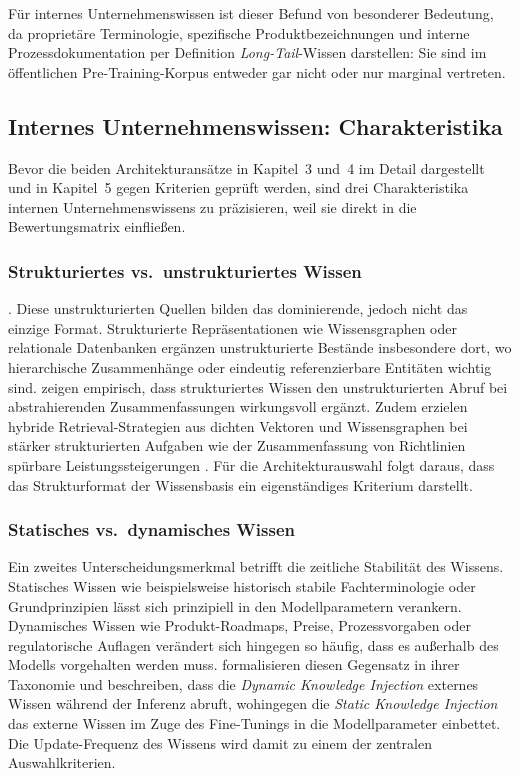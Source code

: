 Für internes Unternehmenswissen ist dieser Befund von besonderer Bedeutung, 
da proprietäre Terminologie, spezifische Produktbezeichnungen und interne 
Prozessdokumentation per Definition \textit{Long-Tail}-Wissen darstellen: Sie sind im 
öffentlichen Pre-Training-Korpus entweder gar nicht oder nur marginal vertreten.

\subsection{Internes Unternehmenswissen: Charakteristika}
\label{sec:unternehmenswissen}

Bevor die beiden Architekturansätze in Kapitel~3 und~4 im Detail dargestellt und in Kapitel~5 gegen Kriterien geprüft werden, sind drei Charakteristika internen Unternehmenswissens zu präzisieren, weil sie direkt in die Bewertungsmatrix einfließen.

\subsubsection{Strukturiertes vs.\ unstrukturiertes Wissen}
\label{sec:strukturiertes-wissen}

. Diese unstrukturierten Quellen bilden das dominierende, jedoch nicht das einzige Format. Strukturierte Repräsentationen wie Wissensgraphen oder relationale Datenbanken ergänzen unstrukturierte Bestände insbesondere dort, wo hierarchische Zusammenhänge oder eindeutig referenzierbare Entitäten wichtig sind. \textcite[17]{Karakurt.2026} zeigen empirisch, dass strukturiertes Wissen den unstrukturierten Abruf bei abstrahierenden Zusammenfassungen wirkungsvoll ergänzt. Zudem erzielen hybride Retrieval-Strategien aus dichten Vektoren und Wissensgraphen bei stärker strukturierten Aufgaben wie der Zusammenfassung von Richtlinien spürbare Leistungssteigerungen \autocite[18]{Karakurt.2026}. Für die Architekturauswahl folgt daraus, dass das Strukturformat der Wissensbasis ein eigenständiges Kriterium darstellt.

\subsubsection{Statisches vs.\ dynamisches Wissen}
\label{sec:dynamisches-wissen}

Ein zweites Unterscheidungsmerkmal betrifft die zeitliche Stabilität des Wissens. Statisches Wissen wie beispielsweise historisch stabile Fachterminologie oder Grundprinzipien lässt sich prinzipiell in den Modellparametern verankern. Dynamisches Wissen wie Produkt-Roadmaps, Preise, Prozessvorgaben oder regulatorische Auflagen verändert sich hingegen so häufig, dass es außerhalb des Modells vorgehalten werden muss. \textcite[3]{Song.2025} formalisieren diesen Gegensatz in ihrer Taxonomie und beschreiben, dass die \textit{Dynamic Knowledge Injection} externes Wissen während der Inferenz abruft, wohingegen die \textit{Static Knowledge Injection} das externe Wissen im Zuge des Fine-Tunings in die Modellparameter einbettet. Die Update-Frequenz des Wissens wird damit zu einem der zentralen Auswahlkriterien.

